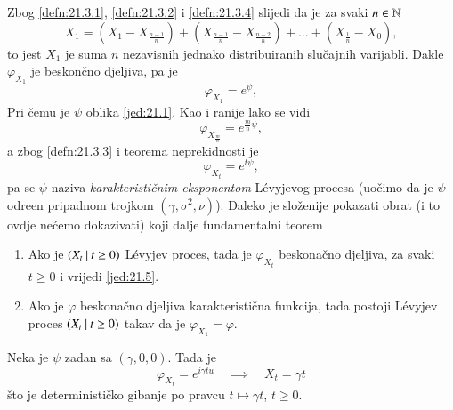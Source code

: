 Zbog \ref{defn:21.3.1}, \ref{defn:21.3.2} i \ref{defn:21.3.4} slijedi da je za svaki $n \in \mathbb{N}$
\begin{equation*}
    X_1 = (X_1 - X_{\frac{n - 1}{n}}) + (X_\frac{n - 1}{n} - X_\frac{n - 2}{n}) + \ldots + (X_\frac{1}{n} - X_0),
\end{equation*}
to jest $X_1$ je suma $n$ nezavisnih jednako distribuiranih slu\v cajnih varijabli.
Dakle $\varphi_{X_1}$ je beskon\v cno djeljiva, pa je
\begin{equation}    \label{jed:21.4}
    \varphi_{X_1} = e^\psi,
\end{equation}
Pri \v cemu je $\psi$ oblika \eqref{jed:21.1}.
Kao i ranije lako se vidi
\begin{equation}
    \varphi_{X_\frac{m}{n}} = e^{\frac{m}{n} \psi},
\end{equation}
a zbog \ref{defn:21.3.3} i teorema neprekidnosti je
\begin{equation}    \label{jed:21.5}
    \varphi_{X_t} = e^{t \psi},
\end{equation}
pa se $\psi$ naziva \emph{karakteristi\v cnim eksponentom} L\' evyjevog procesa (uo\v cimo da je $\psi$ odre\dj en pripadnom trojkom $(\gamma, \sigma^2, \nu)$).
Daleko je slo\v zenije pokazati obrat (i to ovdje ne\' cemo dokazivati) koji dalje fundamentalni teorem

\begin{tm}  \label{tm:21.6}
    \begin{enumerate}[label=(\alph*)]
        \item   \label{tm:21.6.1}
        Ako je $({X_t} \: | \: {t \geq 0})$ L\' evyjev proces, tada je $\varphi_{X_t}$ beskona\v cno djeljiva, za svaki $t \geq 0$ i vrijedi \eqref{jed:21.5}.
        \item   \label{tm:21.6.2}
        Ako je $\varphi$ beskona\v cno djeljiva karakteristi\v cna funkcija, tada postoji L\' evyjev proces $({X_t} \: | \: {t \geq 0})$ takav da je $\varphi_{X_1} = \varphi$.
    \end{enumerate}
\end{tm}

\begin{pr}  \label{pr:21.7}
    Neka je $\psi$ zadan sa $(\gamma, 0, 0)$.
    Tada je
    \begin{equation*}
        \varphi_{X_t} = e^{i \gamma t u} \quad \implies \quad X_t = \gamma t
    \end{equation*} 
    \v sto je deterministi\v cko gibanje po pravcu $t \mapsto \gamma t$, $t \geq 0$.
\end{pr}

